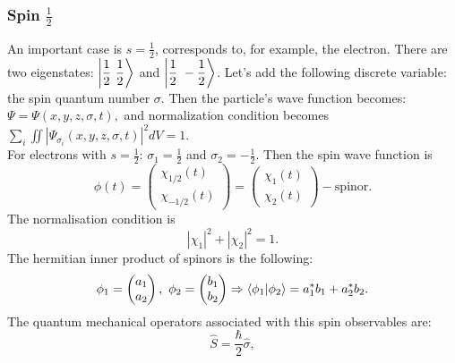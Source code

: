 \documentclass[a4paper, 11pt]{article}
\begin{document}
\subsubsection{Spin $\frac{1}{2}$}
An important case is $s = \frac{1}{2}$, corresponds to, for example,  the electron. There are two eigenstates: $\displaystyle{\ket{\frac{1}{2} ~ \frac{1}{2}}}$ and $\displaystyle{\ket{\frac{1}{2} ~ -\frac{1}{2}}}
$. %
Let's add the following discrete variable: the spin quantum number $\sigma.$ Then the particle's wave function becomes:
$\Psi = \Psi(x,y,z, \sigma, t), $ and normalization condition becomes $\displaystyle{\sum_i \iint |\Psi_{\sigma_i} (x,y,z, \sigma, t)|^2dV=1}.$ \\
For electrons with $s = \frac{1}{2}$: $\sigma_1 = \frac{1}{2}$ and $\sigma_2 = -\frac{1}{2}$. Then  the spin wave function is
$$\displaystyle{\phi(t) = 
\begin{pmatrix}
	\chi_{1/2}(t) \\
	\chi_{-1/2}(t)
\end{pmatrix} = 
\begin{pmatrix}
	\chi_1 (t) \\
	\chi_2(t)
\end{pmatrix}} - \text{spinor}.$$
The normalisation condition is
$$|\chi_1| ^2 + |\chi_2|^2 =1.$$
The hermitian inner product of spinors is the following:
$$\phi_1 = \begin{pmatrix}
	a_1 \\
	a_2
\end{pmatrix}, ~ \phi_2 = \begin{pmatrix}
	b_1 \\
	b_2
\end{pmatrix} \Rightarrow \bra{\phi_1}\ket{\phi_2} = a_1^* b_1 + a_2^* b_2.$$
The quantum mechanical operators associated with this spin observables are:
$$\hat{S}  = \frac{\hbar}{2} \hat{ \sigma},$$
\end{document}
